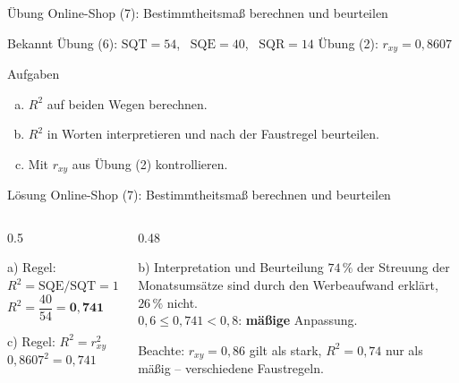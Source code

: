 \documentclass[aspectratio=169,11pt]{beamer}
\begin{document}
\begin{frame}{Übung Online-Shop (7): Bestimmtheitsmaß berechnen und beurteilen}
  \begin{block}{Bekannt}
    Übung (6): $\text{SQT} = 54$, \ $\text{SQE} = 40$, \ $\text{SQR} = 14$
    \qquad Übung (2): $r_{xy} = 0{,}8607$
  \end{block}

  \medskip

  \begin{exampleblock}{Aufgaben}
    \begin{enumerate}[a)]
      \setlength{\itemsep}{3pt}
      \item $R^{2}$ auf beiden Wegen berechnen.
      \item $R^{2}$ in Worten interpretieren und nach der Faustregel beurteilen.
      \item Mit $r_{xy}$ aus Übung (2) kontrollieren.
    \end{enumerate}
  \end{exampleblock}
\end{frame}

\begin{frame}{Lösung Online-Shop (7): Bestimmtheitsmaß berechnen und beurteilen}
  \begin{columns}[T]
    \begin{column}{0.5\textwidth}
      \begin{block}{a) Regel: $R^{2} = \text{SQE}/\text{SQT} = 1 - \text{SQR}/\text{SQT}$}
        \vspace{-4pt}
        \[
          R^{2} = \frac{40}{54} = \mathbf{0{,}741}
          \qquad
          R^{2} = 1 - \frac{14}{54} = 0{,}741
        \]
        \vspace{-10pt}
      \end{block}
      \begin{block}{c) Regel: $R^{2} = r_{xy}^{2}$}
        $0{,}8607^{2} = 0{,}741$ \checkmark
      \end{block}
    \end{column}
    \begin{column}{0.48\textwidth}
      \begin{exampleblock}{b) Interpretation und Beurteilung}
        $74\,\%$ der Streuung der Monatsumsätze sind durch den Werbeaufwand
        erklärt, $26\,\%$ nicht.\\[3pt]
        $0{,}6 \le 0{,}741 < 0{,}8$: \textbf{mäßige} Anpassung.
      \end{exampleblock}
      \footnotesize Beachte: $r_{xy} = 0{,}86$ gilt als stark, $R^{2} = 0{,}74$
      nur als mäßig -- verschiedene Faustregeln.
    \end{column}
  \end{columns}
\end{frame}
\end{document}
